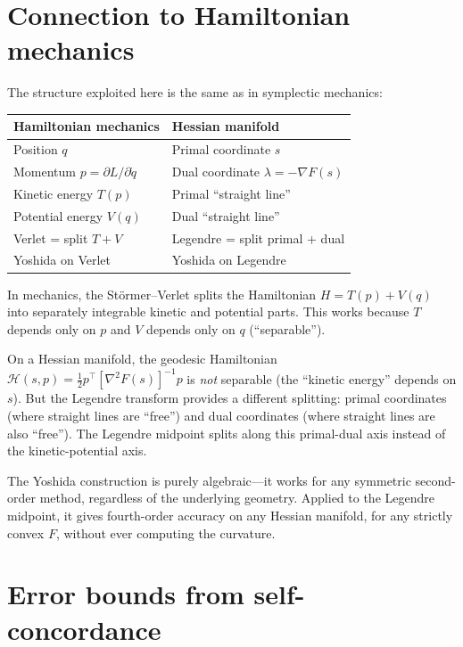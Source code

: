 \documentclass[11pt]{article}
\begin{document}
\section{Connection to Hamiltonian mechanics}

The structure exploited here is the same as in symplectic mechanics:

\begin{center}
\begin{tabular}{@{}ll@{}}
\toprule
\textbf{Hamiltonian mechanics} & \textbf{Hessian manifold} \\
\midrule
Position $q$ & Primal coordinate $s$ \\
Momentum $p = \partial L / \partial \dot{q}$ & Dual coordinate $\lambda = -\nabla F(s)$ \\
Kinetic energy $T(p)$ & Primal ``straight line'' \\
Potential energy $V(q)$ & Dual ``straight line'' \\
Verlet = split $T + V$ & Legendre = split primal + dual \\
Yoshida on Verlet & Yoshida on Legendre \\
\bottomrule
\end{tabular}
\end{center}

In mechanics, the St\"ormer--Verlet splits the Hamiltonian $H = T(p) + V(q)$
into separately integrable kinetic and potential parts.  This works
because $T$ depends only on $p$ and $V$ depends only on $q$
(``separable'').

On a Hessian manifold, the geodesic Hamiltonian
$\mathcal{H}(s, p) = \frac{1}{2} p^\top [\nabla^2 F(s)]^{-1} p$
is \emph{not} separable (the ``kinetic energy'' depends on $s$).
But the Legendre transform provides a different splitting: primal
coordinates (where straight lines are ``free'') and dual coordinates
(where straight lines are also ``free'').  The Legendre midpoint
splits along this primal-dual axis instead of the kinetic-potential
axis.

The Yoshida construction is purely algebraic---it works for any
symmetric second-order method, regardless of the underlying geometry.
Applied to the Legendre midpoint, it gives fourth-order accuracy on
any Hessian manifold, for any strictly convex $F$, without ever
computing the curvature.

\section{Error bounds from self-concordance}
\end{document}
